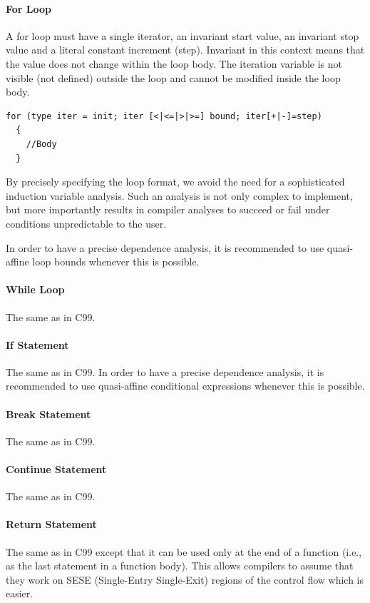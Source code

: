 \paragraph{For Loop}

A \pencil for loop must have a single iterator, an invariant start
value, an invariant stop value and a literal constant increment (step).
Invariant in this context means that the value does not change within
the loop body.
The iteration variable is not visible (not defined) outside the loop and cannot be modified
inside the loop body.

\begin{lstlisting}[language=pencil]
  for (type iter = init; iter [<|<=|>|>=] bound; iter[+|-]=step)
  {
    //Body
  }
\end{lstlisting}
By precisely specifying the loop format, we avoid the need for
a sophisticated induction variable analysis.
Such an analysis is not only complex to implement, but more
importantly results in compiler analyses to succeed or fail under
conditions unpredictable to the user.

In order to have a precise dependence analysis, it is recommended
to use quasi-affine loop bounds
whenever this is possible.

\paragraph{While Loop}
The same as in C99.
\paragraph{If Statement}
The same as in C99.
In order to have a precise dependence analysis, it is recommended
to use quasi-affine conditional expressions
whenever this is possible.
\paragraph{Break Statement}
The same as in C99.
\paragraph{Continue Statement}
The same as in C99.
\paragraph{Return Statement}
The same as in C99 except that it can be used only at the end of a function
(i.e., as the last statement in a function body).
This allows \pencil compilers to assume that they work on SESE
(Single-Entry Single-Exit) regions of the control flow which is easier.

